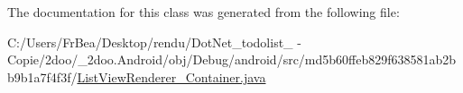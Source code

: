 The documentation for this class was generated from the following file:\begin{CompactItemize}
\item 
C:/Users/FrBea/Desktop/rendu/DotNet\_\-todolist\_ - Copie/2doo/\_\-2doo.Android/obj/Debug/android/src/md5b60ffeb829f638581ab2bb9b1a7f4f3f/\hyperlink{_list_view_renderer___container_8java}{ListViewRenderer\_\-Container.java}\end{CompactItemize}
